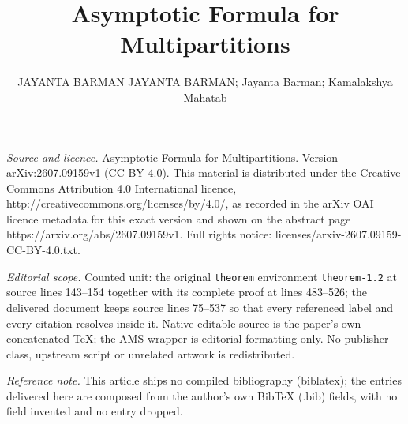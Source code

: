 \documentclass[10pt,a4paper]{amsart}
\numberwithin{equation}{section}
\begin{document}
\title[Asymptotic Formula for Multipartitions]{Asymptotic Formula for Multipartitions}
\author{JAYANTA BARMAN JAYANTA BARMAN; Jayanta Barman; Kamalakshya Mahatab}
\date{}
\maketitle
\noindent\emph{Source and licence.} Asymptotic Formula for Multipartitions. Version arXiv:2607.09159v1 (CC BY 4.0). This material is distributed under the Creative Commons Attribution 4.0 International licence, http://creativecommons.org/licenses/by/4.0/, as recorded in the arXiv OAI licence metadata for this exact version and shown on the abstract page https://arxiv.org/abs/2607.09159v1. Full rights notice: licenses/arxiv-2607.09159-CC-BY-4.0.txt.\par\smallskip
\noindent\textit{Editorial scope.} Counted unit: the original \texttt{theorem} environment \texttt{theorem-1.2} at source lines 143--154 together with its complete proof at lines 483--526; the delivered document keeps source lines 75--537 so that every referenced label and every citation resolves inside it. Native editable source is the paper's own concatenated TeX; the AMS wrapper is editorial formatting only. No publisher class, upstream script or unrelated artwork is redistributed.
\par\smallskip\noindent\textit{Reference note.} This article ships no compiled bibliography (biblatex); the entries delivered here are composed from the author's own BibTeX (.bib) fields, with no field invented and no entry dropped.
\end{document}
